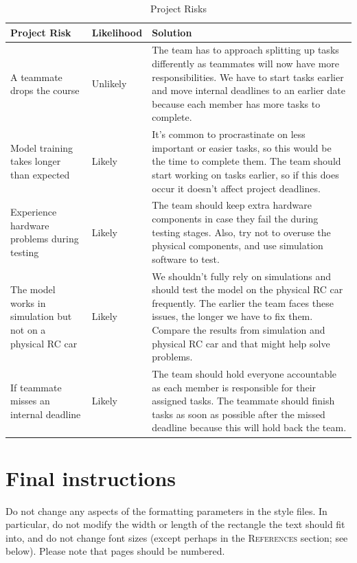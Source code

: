 \documentclass{article} %
\begin{document}
\begin{table}[H]
\caption{Project Risks}
\centering
\begin{tabular}{|p{4cm}|p{2.5cm}|p{7cm}|}
\hline
\textbf{Project Risk} & \textbf{Likelihood} & \textbf{Solution} \\ \hline
A teammate drops the course & Unlikely & The team has to approach splitting up tasks differently as teammates will now have more responsibilities. We have to start tasks earlier and move internal deadlines to an earlier date because each member has more tasks to complete. \\ \hline
Model training takes longer than expected & Likely & It’s common to procrastinate on less important or easier tasks, so this would be the time to complete them. The team should start working on tasks earlier, so if this does occur it doesn’t affect project deadlines. \\ \hline
Experience hardware problems during testing & Likely & The team should keep extra hardware components in case they fail the during testing stages. Also, try not to overuse the physical components, and use simulation software to test. \\ \hline
The model works in simulation but not on a physical RC car & Likely & We shouldn’t fully rely on simulations and should test the model on the physical RC car frequently. The earlier the team faces these issues, the longer we have to fix them. Compare the results from simulation and physical RC car and that might help solve problems. \\ \hline
If teammate misses an internal deadline & Likely & The team should hold everyone accountable as each member is responsible for their assigned tasks. The teammate should finish tasks as soon as possible after the missed deadline because this will hold back the team. \\ \hline
\end{tabular}
\end{table}


\section{Final instructions}
Do not change any aspects of the formatting parameters in the style files.
In particular, do not modify the width or length of the rectangle the text
should fit into, and do not change font sizes (except perhaps in the
\textsc{References} section; see below). Please note that pages should be
numbered.
\end{document}
